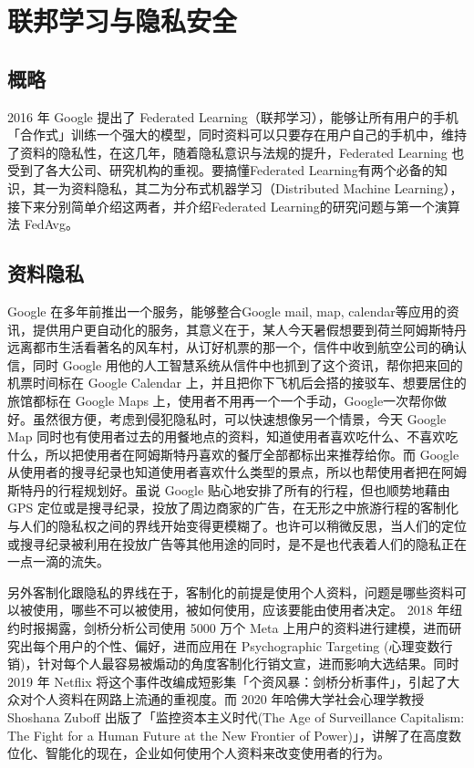 \chapter{联邦学习与隐私安全}
\label{chap:2}

\section{概略}

2016 年 Google 提出了 Federated Learning（联邦学习），能够让所有用户的手机「合作式」训练一个强大的模型，同时资料可以只要存在用户自己的手机中，维持了资料的隐私性，在这几年，随着隐私意识与法规的提升，Federated Learning 也受到了各大公司、研究机构的重视。要搞懂Federated Learning有两个必备的知识，其一为资料隐私，其二为分布式机器学习（Distributed Machine Learning），接下来分别简单介绍这两者，并介绍Federated Learning的研究问题与第一个演算法 FedAvg。


\section{资料隐私}

Google 在多年前推出一个服务，能够整合Google mail, map, calendar等应用的资讯，提供用户更自动化的服务，其意义在于，某人今天暑假想要到荷兰阿姆斯特丹远离都市生活看著名的风车村，从订好机票的那一个，信件中收到航空公司的确认信，同时 Google 用他的人工智慧系统从信件中也抓到了这个资讯，帮你把来回的机票时间标在 Google Calendar 上，并且把你下飞机后会搭的接驳车、想要居住的旅馆都标在 Google Maps 上，使用者不用再一个一个手动，Google一次帮你做好。虽然很方便，考虑到侵犯隐私时，可以快速想像另一个情景，今天 Google Map 同时也有使用者过去的用餐地点的资料，知道使用者喜欢吃什么、不喜欢吃什么，所以把使用者在阿姆斯特丹喜欢的餐厅全部都标出来推荐给你。而 Google 从使用者的搜寻纪录也知道使用者喜欢什么类型的景点，所以也帮使用者把在阿姆斯特丹的行程规划好。虽说 Google 贴心地安排了所有的行程，但也顺势地藉由 GPS 定位或是搜寻纪录，投放了周边商家的广告，在无形之中旅游行程的客制化与人们的隐私权之间的界线开始变得更模糊了。也许可以稍微反思，当人们的定位或搜寻纪录被利用在投放广告等其他用途的同时，是不是也代表着人们的隐私正在一点一滴的流失。

 另外客制化跟隐私的界线在于，客制化的前提是使用个人资料，问题是哪些资料可以被使用，哪些不可以被使用，被如何使用，应该要能由使用者决定。 2018 年纽约时报揭露，剑桥分析公司使用 5000 万个 Meta 上用户的资料进行建模，进而研究出每个用户的个性、偏好，进而应用在 Psychographic Targeting (心理变数行销)，针对每个人最容易被煽动的角度客制化行销文宣，进而影响大选结果。同时 2019 年 Netflix 将这个事件改编成短影集「个资风暴：剑桥分析事件」，引起了大众对个人资料在网路上流通的重视度。而 2020 年哈佛大学社会心理学教授 Shoshana Zuboff 出版了「监控资本主义时代(The Age of Surveillance Capitalism: The Fight for a Human Future at the New Frontier of Power)」，讲解了在高度数位化、智能化的现在，企业如何使用个人资料来改变使用者的行为。

